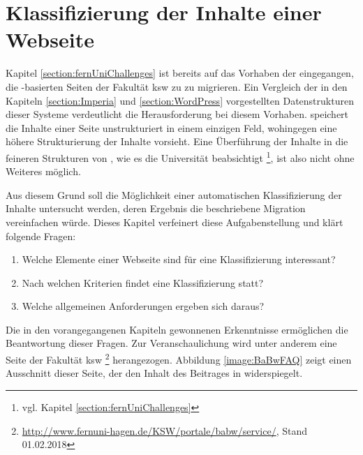 \section{Klassifizierung der Inhalte einer Webseite}
    \label{section:WebpageClassification}
    Kapitel \ref{section:fernUniChallenges}
    ist bereits auf das Vorhaben der {\fernUni}
    eingegangen, die {\wordpress}-basierten Seiten der Fakultät
    \gls{ksw} zu {\imperia} zu migrieren.
    Ein Vergleich der in den Kapiteln
    \ref{section:Imperia} und \ref{section:WordPress} vorgestellten
    Datenstrukturen dieser Systeme verdeutlicht die Herausforderung bei diesem
    Vorhaben.
    {\wordpress} speichert die Inhalte einer Seite unstrukturiert in einem einzigen Feld,
    wohingegen {\imperia} eine höhere Strukturierung der Inhalte vorsieht.
    Eine Überführung der Inhalte in die feineren Strukturen von
    {\imperia}, wie es die Universität beabsichtigt
    \footnote{vgl. Kapitel \ref{section:fernUniChallenges}},
    ist also nicht ohne Weiteres möglich.

    Aus diesem Grund soll die Möglichkeit einer automatischen
    Klassifizierung der Inhalte untersucht werden,
    deren Ergebnis die beschriebene Migration vereinfachen würde.
    Dieses Kapitel verfeinert diese Aufgabenstellung und klärt folgende Fragen:

    \begin{enumerate}
        \item Welche Elemente einer Webseite sind für eine Klassifizierung interessant?
        \item Nach welchen Kriterien findet eine Klassifizierung statt?
        \item Welche allgemeinen Anforderungen ergeben sich daraus?
    \end{enumerate}

    Die in den vorangegangenen Kapiteln gewonnenen Erkenntnisse ermöglichen
    die Beantwortung dieser Fragen.
    Zur Veranschaulichung wird unter anderem eine Seite der Fakultät \gls{ksw}
    \footnote{\url{http://www.fernuni-hagen.de/KSW/portale/babw/service/}, Stand 01.02.2018}
    herangezogen.
    Abbildung \ref{image:BaBwFAQ} zeigt einen Ausschnitt dieser
    Seite, der den Inhalt des Beitrages in {\wordpress} widerspiegelt.

